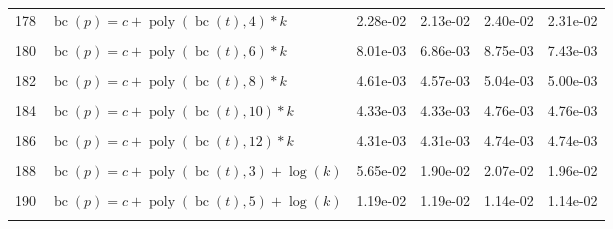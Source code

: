 \documentclass[12pt,a4paper]{article}
\DeclareMathOperator{\bc}{bc}
\DeclareMathOperator{\poly}{poly}
\begin{document}
\begin{longtable}[t]{ll>{\raggedleft\arraybackslash}p{2cm}>{\raggedleft\arraybackslash}p{2cm}>{\raggedleft\arraybackslash}p{2cm}>{\raggedleft\arraybackslash}p{2cm}}
178 & $\bc(p) = c + \poly\left( \bc(t), 4 \right) * k$ & 2.28e-02 & 2.13e-02 & 2.40e-02 & 2.31e-02\\
\cellcolor{gray!6}{179} & \cellcolor{gray!6}{$\bc(p) = c + \poly\left( \bc(t), 5 \right) * k$} & \cellcolor{gray!6}{1.00e-02} & \cellcolor{gray!6}{1.00e-02} & \cellcolor{gray!6}{9.87e-03} & \cellcolor{gray!6}{9.87e-03}\\
180 & $\bc(p) = c + \poly\left( \bc(t), 6 \right) * k$ & 8.01e-03 & 6.86e-03 & 8.75e-03 & 7.43e-03\\
\cellcolor{gray!6}{181} & \cellcolor{gray!6}{$\bc(p) = c + \poly\left( \bc(t), 7 \right) * k$} & \cellcolor{gray!6}{5.72e-03} & \cellcolor{gray!6}{5.06e-03} & \cellcolor{gray!6}{5.62e-03} & \cellcolor{gray!6}{5.47e-03}\\
182 & $\bc(p) = c + \poly\left( \bc(t), 8 \right) * k$ & 4.61e-03 & 4.57e-03 & 5.04e-03 & 5.00e-03\\
\cellcolor{gray!6}{183} & \cellcolor{gray!6}{$\bc(p) = c + \poly\left( \bc(t), 9 \right) * k$} & \cellcolor{gray!6}{4.68e-03} & \cellcolor{gray!6}{4.63e-03} & \cellcolor{gray!6}{5.14e-03} & \cellcolor{gray!6}{5.08e-03}\\
184 & $\bc(p) = c + \poly\left( \bc(t), 10 \right) * k$ & 4.33e-03 & 4.33e-03 & 4.76e-03 & 4.76e-03\\
\cellcolor{gray!6}{185} & \cellcolor{gray!6}{$\bc(p) = c + \poly\left( \bc(t), 11 \right) * k$} & \cellcolor{gray!6}{4.34e-03} & \cellcolor{gray!6}{4.33e-03} & \cellcolor{gray!6}{4.77e-03} & \cellcolor{gray!6}{4.76e-03}\\
186 & $\bc(p) = c + \poly\left( \bc(t), 12 \right) * k$ & 4.31e-03 & 4.31e-03 & 4.74e-03 & 4.74e-03\\
\cellcolor{gray!6}{187} & \cellcolor{gray!6}{$\bc(p) = c + \poly\left( \bc(t), 13 \right) * k$} & \cellcolor{gray!6}{4.31e-03} & \cellcolor{gray!6}{4.31e-03} & \cellcolor{gray!6}{4.74e-03} & \cellcolor{gray!6}{4.74e-03}\\
188 & $\bc(p) = c + \poly\left( \bc(t), 3 \right) + \log(k)$ & 5.65e-02 & 1.90e-02 & 2.07e-02 & 1.96e-02\\
\cellcolor{gray!6}{189} & \cellcolor{gray!6}{$\bc(p) = c + \poly\left( \bc(t), 4 \right) + \log(k)$} & \cellcolor{gray!6}{2.40e-02} & \cellcolor{gray!6}{2.26e-02} & \cellcolor{gray!6}{2.49e-02} & \cellcolor{gray!6}{2.42e-02}\\
190 & $\bc(p) = c + \poly\left( \bc(t), 5 \right) + \log(k)$ & 1.19e-02 & 1.19e-02 & 1.14e-02 & 1.14e-02\\
\cellcolor{gray!6}{191} & \cellcolor{gray!6}{$\bc(p) = c + \poly\left( \bc(t), 6 \right) + \log(k)$} & \cellcolor{gray!6}{1.03e-02} & \cellcolor{gray!6}{9.33e-03} & \cellcolor{gray!6}{1.05e-02} & \cellcolor{gray!6}{9.34e-03}\\

\end{longtable}
\end{document}
